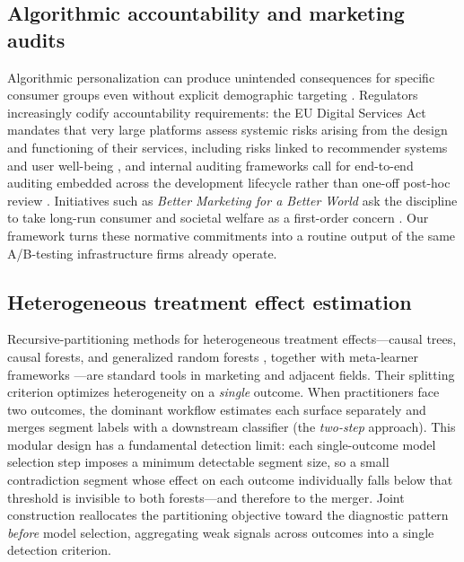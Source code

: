 \documentclass[12pt,a4paper]{article}
\begin{document}
\subsection{Algorithmic accountability and marketing audits}

Algorithmic personalization can produce unintended consequences for specific consumer groups even without explicit demographic targeting \citep{lambrecht2019algorithmic, ascarza2018retention}. Regulators increasingly codify accountability requirements: the EU Digital Services Act mandates that very large platforms assess systemic risks arising from the design and functioning of their services, including risks linked to recommender systems and user well-being \citep{dsa2022article34}, and internal auditing frameworks call for end-to-end auditing embedded across the development lifecycle rather than one-off post-hoc review \citep{raji2020_internal_audit}. Initiatives such as \emph{Better Marketing for a Better World} ask the discipline to take long-run consumer and societal welfare as a first-order concern \citep{chandy2021better}. Our framework turns these normative commitments into a routine output of the same A/B-testing infrastructure firms already operate.

\subsection{Heterogeneous treatment effect estimation}

Recursive-partitioning methods for heterogeneous treatment effects---causal trees, causal forests, and generalized random forests \citep{athey2016recursive, wager2018estimation, athey2019grf}, together with meta-learner frameworks \citep{kunzel2019metalearners, nie2021quasioracle}---are standard tools in marketing and adjacent fields. Their splitting criterion optimizes heterogeneity on a \emph{single} outcome. When practitioners face two outcomes, the dominant workflow estimates each surface separately and merges segment labels with a downstream classifier (the \emph{two-step} approach). This modular design has a fundamental detection limit: each single-outcome model selection step imposes a minimum detectable segment size, so a small contradiction segment whose effect on each outcome individually falls below that threshold is invisible to both forests---and therefore to the merger. Joint construction reallocates the partitioning objective toward the diagnostic pattern \emph{before} model selection, aggregating weak signals across outcomes into a single detection criterion.
\end{document}
